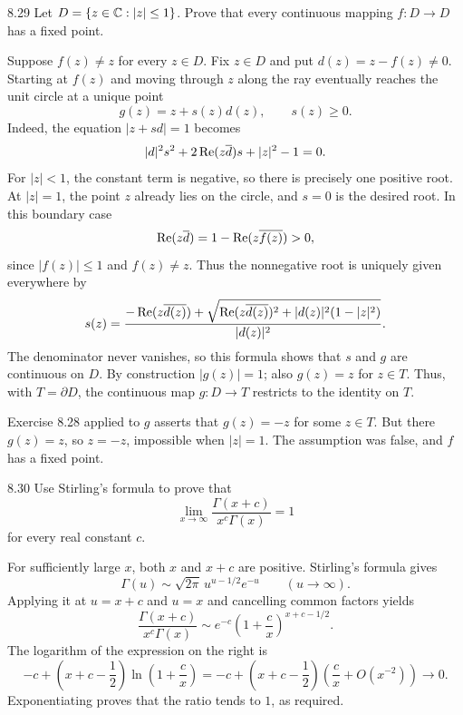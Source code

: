 \documentclass[11pt, oneside]{article}
\begin{document}
\begin{exercise}{8.29}
Let $D=\{z\in\mathbb{C}:|z|\le1\}$. Prove that every continuous mapping $f\colon D\to D$ has a fixed point.
\end{exercise}
\begin{solution}
Suppose $f(z)\ne z$ for every $z\in D$. Fix $z\in D$ and put $d(z)=z-f(z)\ne0$. Starting at $f(z)$ and moving through $z$ along the ray eventually reaches the unit circle at a unique point
\[
 g(z)=z+s(z)d(z), \qquad s(z)\ge0.
\]
Indeed, the equation $|z+sd|=1$ becomes
\[
 |d|^2s^2+2\operatorname{Re}(z\overline d)s+|z|^2-1=0.
\]
For $|z|<1$, the constant term is negative, so there is precisely one positive root. At $|z|=1$, the point $z$ already lies on the circle, and $s=0$ is the desired root. In this boundary case
\[
 \operatorname{Re}(z\overline d)=1-\operatorname{Re}(z\overline{f(z)})>0,
\]
since $|f(z)|\le1$ and $f(z)\ne z$. Thus the nonnegative root is uniquely given everywhere by
\[
 s(z)=\frac{-\operatorname{Re}(z\overline{d(z)})
 +\sqrt{\operatorname{Re}(z\overline{d(z)})^2+|d(z)|^2(1-|z|^2)}}{|d(z)|^2}.
\]
The denominator never vanishes, so this formula shows that $s$ and $g$ are continuous on $D$. By construction $|g(z)|=1$; also $g(z)=z$ for $z\in T$. Thus, with $T=\partial D$, the continuous map $g\colon D\to T$ restricts to the identity on $T$.

Exercise 8.28 applied to $g$ asserts that $g(z)=-z$ for some $z\in T$. But there $g(z)=z$, so $z=-z$, impossible when $|z|=1$. The assumption was false, and $f$ has a fixed point.
\end{solution}

\begin{exercise}{8.30}
Use Stirling's formula to prove that
\[
 \lim_{x\to\infty}\frac{\Gamma(x+c)}{x^c\Gamma(x)}=1
\]
for every real constant $c$.
\end{exercise}
\begin{solution}
For sufficiently large $x$, both $x$ and $x+c$ are positive. Stirling's formula gives
\[
 \Gamma(u)\sim\sqrt{2\pi}\,u^{u-1/2}e^{-u}\qquad(u\to\infty).
\]
Applying it at $u=x+c$ and $u=x$ and cancelling common factors yields
\[
 \frac{\Gamma(x+c)}{x^c\Gamma(x)}
 \sim e^{-c}\left(1+\frac cx\right)^{x+c-1/2}.
\]
The logarithm of the expression on the right is
\[
 -c+\left(x+c-\frac12\right)\ln\left(1+\frac cx\right)
 =-c+\left(x+c-\frac12\right)\left(\frac cx+O(x^{-2})\right)\longrightarrow0.
\]
Exponentiating proves that the ratio tends to $1$, as required.
\end{solution}
\end{document}
